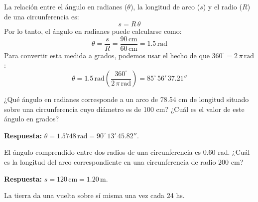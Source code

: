 \documentclass[addpoints]{exam}
\newcommand{\grado}[0]{^{\circ}}
\newcommand{\angulo}[3]{#1\grado \, #2' \, #3''}
\newcommand{\E}[1]{\times 10^{#1}}
\newcommand{\rta}{\textbf{Respuesta: }}
\begin{document}
\begin{questions}
    \begin{solution} 
    La relación entre el ángulo en radianes ($\theta$), la longitud de arco ($s$) y el radio ($R$) de una circunferencia es: $$s = R \, \theta$$ Por lo tanto, el ángulo en radianes puede calcularse como: $$\theta = \frac{s}{R} = \frac{90 \, \text{cm}}{60 \, \text{cm}} = 1.5 \, \text{rad}$$ Para convertir esta medida a grados, podemos usar el hecho de que $360\grado = 2 \, \pi \, \text{rad}$: $$\theta = 1.5 \, \text{rad} \left(\frac{360 \grado}{2 \, \pi \, \text{rad}}\right) = \angulo{85}{56}{37.21}$$
    \end{solution}

    \question ¿Qué ángulo en radianes corresponde a un arco de 78.54 cm de longitud situado sobre una circunferencia cuyo diámetro es de 100 cm? ¿Cuál es el valor de este ángulo en grados?

    \rta $\theta = 1.5748 \, \text{rad} = \angulo{90}{13}{45.82}$.

    \question El ángulo comprendido entre dos radios de una circunferencia es $0.60$ rad. ¿Cuál es la longitud del arco correspondiente en una circunferencia de radio 200 cm?

    \rta $s = 120 \, \text{cm} = 1.20 \, \text{m}$.

    \question La tierra da una vuelta sobre sí misma una vez cada 24 hs.

    \begin{solution}
\end{solution}
\end{questions}
\end{document}
